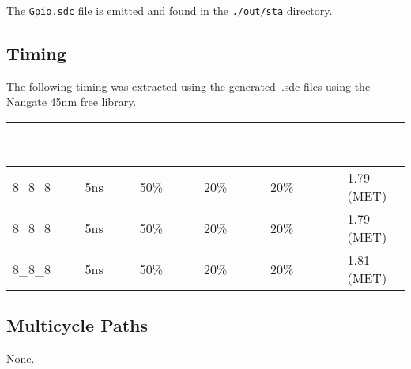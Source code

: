 The \texttt{Gpio.sdc} file is emitted and found in the
\texttt{./out/sta} directory.

\subsection{Timing}

The following timing was extracted using the generated~.sdc files using the
Nangate 45nm free library.

\renewcommand*{\arraystretch}{1.4}
\begin{longtable}[H]{
    | p{}
    | p{}
    | p{}
    | p{}
    | p{}
    | p{} |
  }
  \hline
  \rowcolor{dark-gray}
  \textcolor{white}{\textbf{Config Name}}   &
  \textcolor{white}{\textbf{Period}}        &
  \textcolor{white}{\textbf{Duty Cycle}}    &
  \textcolor{white}{\textbf{Input Delay}}   &
  \textcolor{white}{\textbf{Output Delay}}  &
  \textcolor{white}{\textbf{Slack}}           \\ \hline \hline

  8\_8\_8     &
  5ns                    &
  50\%                   &
  20\%                   &
  20\%                   &
  1.79 (MET)               \\ \hline

  8\_8\_8  &
  5ns                    &
  50\%                   &
  20\%                   &
  20\%                   &
  1.79 (MET)               \\ \hline

  8\_8\_8  &
  5ns                    &
  50\%                   &
  20\%                   &
  20\%                   &
  1.81 (MET)               \\ \hline

  
\end{longtable}
\captionsetup{aboveskip=0pt}
\label{table:timing}
\endgroup

\subsection{Multicycle Paths}
None.
